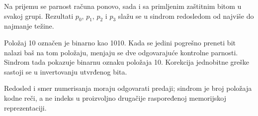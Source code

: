 Na prijemu se parnost računa ponovo, sada i sa primljenim zaštitnim bitom u svakoj grupi. Rezultati $p_0$, $p_1$, $p_2$ i $p_3$ slažu se u sindrom redosledom od najviše do najmanje težine.

Položaj 10 označen je binarno kao 1010. Kada se jedini pogrešno preneti bit nalazi baš na tom položaju, menjaju se dve odgovarajuće kontrolne parnosti. Sindrom tada pokazuje binarnu oznaku položaja 10. Korekcija jednobitne greške sastoji se u invertovanju utvrđenog bita.

Redosled i smer numerisanja moraju odgovarati predaji; sindrom je broj položaja kodne reči, a ne indeks u proizvoljno drugačije raspoređenoj memorijskoj reprezentaciji.
